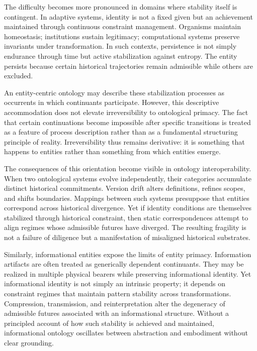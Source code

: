 \documentclass[12pt]{article}
\begin{document}
The difficulty becomes more pronounced in domains where stability itself is contingent. In adaptive systems, identity is not a fixed given but an achievement maintained through continuous constraint management. Organisms maintain homeostasis; institutions sustain legitimacy; computational systems preserve invariants under transformation. In such contexts, persistence is not simply endurance through time but active stabilization against entropy. The entity persists because certain historical trajectories remain admissible while others are excluded.

An entity-centric ontology may describe these stabilization processes as occurrents in which continuants participate. However, this descriptive accommodation does not elevate irreversibility to ontological primacy. The fact that certain continuations become impossible after specific transitions is treated as a feature of process description rather than as a fundamental structuring principle of reality. Irreversibility thus remains derivative: it is something that happens to entities rather than something from which entities emerge.

The consequences of this orientation become visible in ontology interoperability. When two ontological systems evolve independently, their categories accumulate distinct historical commitments. Version drift alters definitions, refines scopes, and shifts boundaries. Mappings between such systems presuppose that entities correspond across historical divergence. Yet if identity conditions are themselves stabilized through historical constraint, then static correspondences attempt to align regimes whose admissible futures have diverged. The resulting fragility is not a failure of diligence but a manifestation of misaligned historical substrates.

Similarly, informational entities expose the limits of entity primacy. Information artifacts are often treated as generically dependent continuants. They may be realized in multiple physical bearers while preserving informational identity. Yet informational identity is not simply an intrinsic property; it depends on constraint regimes that maintain pattern stability across transformations. Compression, transmission, and reinterpretation alter the degeneracy of admissible futures associated with an informational structure. Without a principled account of how such stability is achieved and maintained, informational ontology oscillates between abstraction and embodiment without clear grounding.
\end{document}
